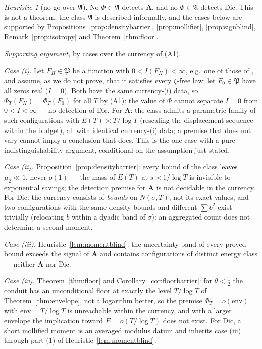 \documentclass[11pt]{amsart}
\theoremstyle{plain}
\theoremstyle{definition}
\theoremstyle{remark}
\newtheorem{heuristic}[theorem]{Heuristic}
\newcommand{\Dic}{\mathrm{Dic}}
\newcommand{\Aax}{\mathbf{A}}
\begin{document}
\begin{heuristic}[no-go over $\mathfrak A$]\label{thm:nogo}
No $\Phi\in\mathfrak A$ detects $\Aax$, and no $\Phi\in\mathfrak A$ detects $\Dic$. This is not a theorem: the class $\mathfrak A$ is described informally, and the cases below are supported by Propositions~\ref{prop:densitybarrier}, \ref{prop:mollifier}, \ref{prop:signblind}, Remark~\ref{prop:isotropy} and Theorem~\ref{thm:floor}.
\end{heuristic}

\emph{Supporting argument,} by cases over the currency of (A1).

\emph{Case \textup{(i)}.} Let $F_H\in\mathfrak P$ be a function with $0<I(F_H)<\infty$, e.g.\ one of those of \cite[\S2.3]{P30}, and assume, as we do not prove, that it satisfies every $\zeta$-free law; let $F_0\in\mathfrak P$ have all zeros real ($I=0$). Both have the same currency-(i) data, so $\Phi_T(F_H)=\Phi_T(F_0)$ for all $T$ by (A1): the value of $\Phi$ cannot separate $I=0$ from $0<I<\infty$ --- no detection of $\Dic$. For $\Aax$: the class admits a parametric family of such configurations with $E(T)\asymp T/\log T$ (rescaling the displacement sequence within the budget), all with identical currency-(i) data; a premise that does not vary cannot imply a conclusion that does. This is the one case with a pure indistinguishability argument, conditional on the assumption just stated.

\emph{Case \textup{(ii)}.} Proposition~\ref{prop:densitybarrier}: every bound of the class leaves $\mu_2\ll1$, never $o(1)$ --- the mass of $E(T)$ at $s\asymp1/\log T$ is invisible to exponential savings; the detection premise for $\Aax$ is not decidable in the currency. For $\Dic$: the currency consists of \emph{bounds} on $N(\sigma,T)$, not its exact values, and two configurations with the same density bounds and different $\sum b^2$ exist trivially (relocating $b$ within a dyadic band of $\sigma$): an aggregated count does not determine a second moment.

\emph{Case \textup{(iii)}.} Heuristic~\ref{lem:momentblind}: the uncertainty band of every proved bound exceeds the signal of $\Aax$ and contains configurations of distinct energy class --- neither $\Aax$ nor $\Dic$.

\emph{Case \textup{(iv)}.} Theorem~\ref{thm:floor} and Corollary~\ref{cor:floorbarrier}: for $\theta<\tfrac12$ the conduit has an unconditional floor at exactly the level $T/\log T$ of Theorem~\ref{thm:envelope}, not a logarithm better, so the premise $\Phi_T=o(\mathrm{env})$ with $\mathrm{env}=T/\log T$ is unreachable within the currency, and with a larger envelope the implication toward $E=o(T/\log T)$ does not exist. For $\Dic$, a short mollified moment is an averaged modulus datum and inherits case \textup{(iii)} through part (1) of Heuristic~\ref{lem:momentblind}.
\end{document}
